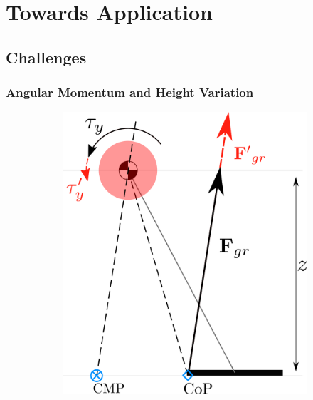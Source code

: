 %
\chapter{Towards Application}

\section{Challenges}
\subsection{Angular Momentum and Height Variation}
\begin{figure}[h]
  \begin{subfigure}{0.3\textwidth}
  \centering
  \includegraphics[width=.8\linewidth]{STYLESTUFF/2DCMPVIZ.png}
   \caption{}
    \label{fig:cmpFza}
  \end{subfigure}
  \begin{subfigure}{0.3\textwidth}
    \centering

\end{subfigure}
\end{figure}
